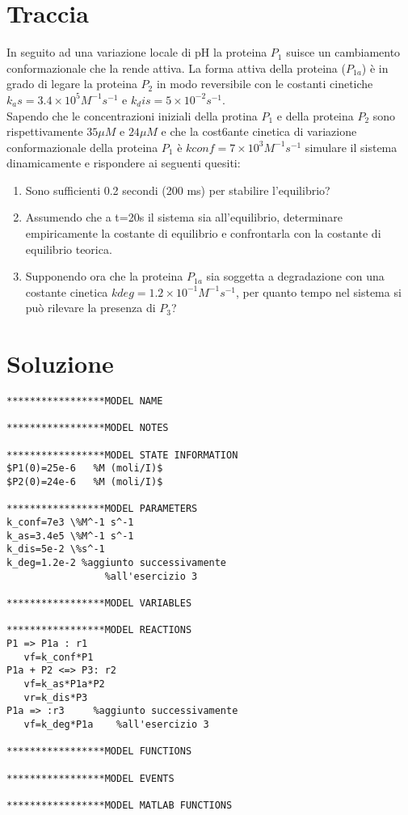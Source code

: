 \documentclass{article}
\begin{document}
\section{Traccia}
In seguito ad una variazione locale di pH la proteina $P_1$ suisce un cambiamento conformazionale che la rende attiva. La forma attiva della proteina ($P_{1a}$)
è in grado di legare la proteina $P_2$ in modo reversibile con le costanti cinetiche $k_as = 3.4 \times 10^5 M^{-1}s^{-1}$ e $k_dis = 5 \times 10^{-2}s^{-1}$.\\
Sapendo che le concentrazioni iniziali della protina $P_1$ e della proteina $P_2$ sono rispettivamente $35 \mu M$ e $24 \mu M$ e che la cost6ante cinetica di variazione conformazionale della proteina $P_1$ è $kconf = 7 \times 10^3 M^{-1}s^{-1}$
simulare il sistema dinamicamente e rispondere ai seguenti quesiti:
\begin{enumerate}
   \item Sono sufficienti 0.2 secondi (200 ms) per stabilire l'equilibrio?
   \item Assumendo che a t=20s il sistema sia all'equilibrio, determinare empiricamente la costante di equilibrio e confrontarla con la costante di equilibrio teorica.
   \item Supponendo ora che la proteina $P_{1a}$ sia soggetta a degradazione con una costante cinetica $kdeg=1.2 \times 10^{-1} M^{-1}s^{-1}$, per quanto tempo nel sistema si può rilevare la presenza di $P_3$?
\end{enumerate}
\section{Soluzione}
\begin{verbatim}
*****************MODEL NAME

*****************MODEL NOTES

*****************MODEL STATE INFORMATION
$P1(0)=25e-6   %M (moli/I)$
$P2(0)=24e-6   %M (moli/I)$

*****************MODEL PARAMETERS
k_conf=7e3 \%M^-1 s^-1
k_as=3.4e5 \%M^-1 s^-1
k_dis=5e-2 \%s^-1
k_deg=1.2e-2 %aggiunto successivamente
                 %all'esercizio 3

*****************MODEL VARIABLES

*****************MODEL REACTIONS
P1 => P1a : r1
   vf=k_conf*P1
P1a + P2 <=> P3: r2
   vf=k_as*P1a*P2
   vr=k_dis*P3
P1a => :r3     %aggiunto successivamente
   vf=k_deg*P1a    %all'esercizio 3

*****************MODEL FUNCTIONS

*****************MODEL EVENTS

*****************MODEL MATLAB FUNCTIONS
\end{verbatim}
\end{document}
